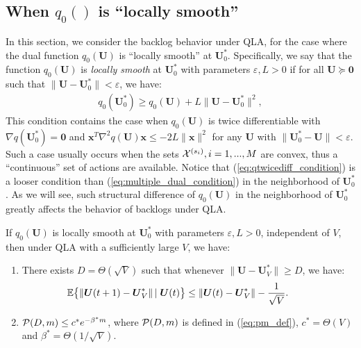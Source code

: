 \documentclass[journal]{IEEEtran}
\newcommand{\expect}[1]{\mathbb{E}\big\{#1\big\}}
\newcommand{\bv}[1]{{\boldsymbol{#1} }}
\newcommand{\script}[1]{{{\cal{#1} }}}
\begin{document}
  

\subsection{When $q_0()$ is ``locally smooth'' }\label{section:firstspecial}%
In this section, we consider the backlog behavior under QLA, for the case where the dual function $q_0(\bv{U})$ is ``locally smooth'' at $\bv{U}^*_0$. Specifically, we say that the function $q_0(\bv{U})$ is \emph{locally smooth} at $\bv{U}^*_0$ with parameters $\varepsilon, L>0$ if for all $\bv{U}\succeq\bv{0}$ such that $\|\bv{U}-\bv{U}_0^*\|< \varepsilon$, we have: 
\begin{eqnarray}
q_0(\bv{U}^*_0)\geq q_0(\bv{U})+L\|\bv{U}-\bv{U}_0^*\|^2,\label{eq:qtwicediff_condition}
\end{eqnarray}
This condition contains the case when $q_0(\bv{U})$ is twice differentiable with $\nabla q(\bv{U}_0^*)=\bv{0}$ and  $\bv{x}^T\nabla^2 q(\bv{U})\bv{x}\leq -2L\|\bv{x}\|^2$ for any $\bv{U}$ with  $\|\bv{U}^*_0-\bv{U}\|< \varepsilon$. Such a case usually occurs when the sets $\script{X}^{(s_i)}, i=1,...,M$ are convex, thus a ``continuous'' set of actions are available. 
Notice that (\ref{eq:qtwicediff_condition}) is a looser condition than (\ref{eq:multiple_dual_condition}) in the neighborhood of $\bv{U}_0^*$. As we will see, such structural difference of $q_0(\bv{U})$ in the neighborhood of $\bv{U}^*_0$ greatly affects the behavior of backlogs under QLA. 
 

\begin{thm}\label{theorem:qtwicediff}
If $q_0(\bv{U})$ is locally smooth at $\bv{U}^*_0$ with parameters $\varepsilon, L>0$, independent of $V$, 
then under QLA with a sufficiently large $V$, we have:
\begin{enumerate}
\item[(a)] There exists $D=\Theta(\sqrt{V})$ such that  whenever $\|\bv{U}-\bv{U}_V^*\|\geq D$, we have:
\begin{eqnarray}
\hspace{-.3in}\expect{\|\bv{U}(t+1)-\bv{U}^*_V\|\left|\right.\bv{U}(t)}\leq \|\bv{U}(t)-\bv{U}_V^*\|-\frac{1}{\sqrt{V}}.\label{eq:qtwicediff_expdrift}
\end{eqnarray}
\item[(b)] $\script{P}(D, m)\leq c^*e^{-\beta^*m}$, where $\script{P}(D, m)$ is defined in (\ref{eq:pm_def}), $c^*=\Theta(V)$ and $\beta^*=\Theta(1/\sqrt{V})$.
\end{enumerate}
\end{thm}
\end{document}
